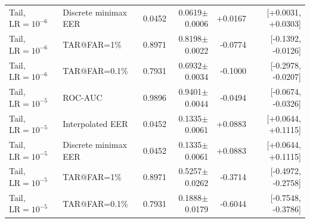 \documentclass[journal]{IEEEtran}
\begin{document}
\begin{table}[!t]
\begin{tabular}{llrrrr}
Tail, $\mathrm{LR}=10^{-6}$ & Discrete minimax EER & 0.0452 & 0.0619$\pm$0.0006 & +0.0167 & [+0.0031, +0.0303] \\
Tail, $\mathrm{LR}=10^{-6}$ & TAR@FAR=1\% & 0.8971 & 0.8198$\pm$0.0022 & -0.0774 & [-0.1392, -0.0126] \\
Tail, $\mathrm{LR}=10^{-6}$ & TAR@FAR=0.1\% & 0.7931 & 0.6932$\pm$0.0034 & -0.1000 & [-0.2978, -0.0207] \\
Tail, $\mathrm{LR}=10^{-5}$ & ROC-AUC & 0.9896 & 0.9401$\pm$0.0044 & -0.0494 & [-0.0674, -0.0326] \\
Tail, $\mathrm{LR}=10^{-5}$ & Interpolated EER & 0.0452 & 0.1335$\pm$0.0061 & +0.0883 & [+0.0644, +0.1115] \\
Tail, $\mathrm{LR}=10^{-5}$ & Discrete minimax EER & 0.0452 & 0.1335$\pm$0.0061 & +0.0883 & [+0.0644, +0.1115] \\
Tail, $\mathrm{LR}=10^{-5}$ & TAR@FAR=1\% & 0.8971 & 0.5257$\pm$0.0262 & -0.3714 & [-0.4972, -0.2758] \\
Tail, $\mathrm{LR}=10^{-5}$ & TAR@FAR=0.1\% & 0.7931 & 0.1888$\pm$0.0179 & -0.6044 & [-0.7548, -0.3786] \\
\bottomrule
\end{tabular}
\end{table}
\end{document}
